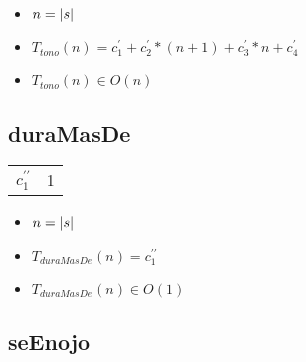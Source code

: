 \documentclass{article}
\begin{document}
    \begin{itemize}
        \item $n = |s|$
        \item $T_{tono}(n) = c^{\prime}_1 + c^{\prime}_2 * (n + 1) + c^{\prime}_3 * n + c^{\prime}_4 $
        \item $T_{tono}(n) \in O(n)$
    \end{itemize}

    \subsection*{duraMasDe}
    \begin{minipage}{0.70\textwidth}
        
    \end{minipage}
    \hfill
    \begin{minipage}{0.25\textwidth}
        \begin{tabular}{|c|c}
            $c^{\prime\prime}_1$ & 1 \\

        \end{tabular}
    \end{minipage}

    \begin{itemize}
        \item $n = |s|$
        \item $T_{duraMasDe}(n) = c^{\prime\prime}_1 $
        \item $T_{duraMasDe}(n) \in O(1)$
    \end{itemize}

    \newpage

    \subsection*{seEnojo}
\end{document}
